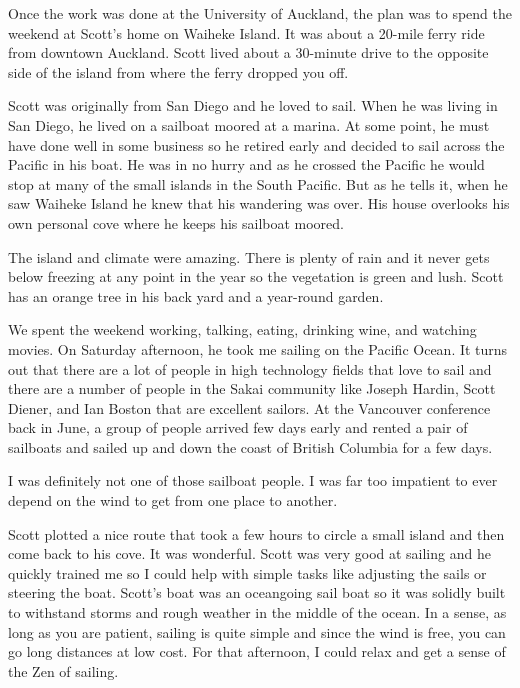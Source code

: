 \documentclass[12pt]{book}
\begin{document}

Once the work was done at the University of Auckland,
the plan was to spend the weekend at Scott's home
on Waiheke Island.   It was about a 20-mile ferry ride
from downtown Auckland.  Scott
lived about a 30-minute drive to the opposite side of the
island from where the ferry dropped you off.

Scott was originally from San Diego and he loved to sail.
When he was living in San Diego, he lived on a sailboat
moored at a marina.  At some point, he must have done well
in some business so he retired early and decided to
sail across the Pacific in his boat.  He was in no hurry
and as he crossed the Pacific he would stop at many of the
small islands in the South Pacific.   But as he tells
it, when he saw Waiheke Island he knew that his wandering
was over.  His house overlooks his own personal cove where
he keeps his sailboat moored.

The island and climate were amazing. There is plenty of rain
and it never gets below freezing at any point in the year
so the vegetation is green and lush.  Scott has an orange tree
in his back yard and a year-round garden.

We spent the weekend working, talking, eating, drinking wine,
and watching movies.  On Saturday afternoon, he
took me sailing on the Pacific Ocean.  It turns out that there
are a lot of people in high technology fields that love to sail
and there are a number of people in the Sakai community like
Joseph Hardin, Scott Diener, and Ian Boston that are excellent
sailors.  At the Vancouver conference back in June, a group
of people arrived few days early and rented a pair of sailboats
and sailed up and down the coast of British Columbia for
a few days.

I was definitely not one of those sailboat people.  I was
far too impatient to ever depend on the wind to get from
one place to another.

Scott plotted a nice route that took a few hours to circle a small
island and then come back to his cove.  It was wonderful.
Scott was very good at sailing and he quickly trained me
so I could help with simple tasks like adjusting the sails
or steering the boat.  Scott's boat was an oceangoing sail
boat so it was solidly built to withstand storms and rough
weather in the middle of the ocean.  In a sense, as long
as you are patient, sailing is quite simple and since
the wind is free, you can go long distances at low
cost.  For that afternoon, I could relax and get a sense
of the Zen of sailing.
\end{document}
